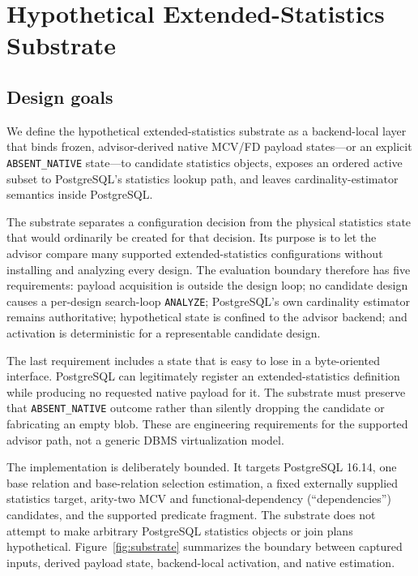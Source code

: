 \section{Hypothetical Extended-Statistics Substrate}
\label{sec:substrate}

\subsection{Design goals}

We define the hypothetical extended-statistics substrate as a backend-local
layer that binds frozen, advisor-derived native MCV/FD payload states---or an
explicit \texttt{ABSENT\_NATIVE} state---to candidate statistics objects,
exposes an ordered active subset to PostgreSQL's statistics lookup path, and
leaves cardinality-estimator semantics inside PostgreSQL.

The substrate separates a configuration decision from the physical
statistics state that would ordinarily be created for that decision.  Its
purpose is to let the advisor compare many supported extended-statistics
configurations without installing and analyzing every design.  The
evaluation boundary therefore has five requirements: payload acquisition is
outside the design loop; no candidate design causes a per-design search-loop
\texttt{ANALYZE}; PostgreSQL's own cardinality estimator remains authoritative;
hypothetical state is confined to the advisor backend; and activation is
deterministic for a representable candidate design.

The last requirement includes a state that is easy to lose in a byte-oriented
interface.  PostgreSQL can legitimately register an extended-statistics
definition while producing no requested native payload for it.  The substrate
must preserve that \texttt{ABSENT\_NATIVE} outcome rather than silently
dropping the candidate or fabricating an empty blob.  These are engineering
requirements for the supported advisor path, not a generic DBMS
virtualization model.

The implementation is deliberately bounded.  It targets PostgreSQL 16.14,
one base relation and base-relation selection estimation, a fixed externally
supplied statistics target, arity-two MCV and functional-dependency
(``dependencies'') candidates, and the supported predicate fragment.  The
substrate does not attempt to make arbitrary PostgreSQL statistics objects or
join plans hypothetical.  Figure~\ref{fig:substrate} summarizes the boundary
between captured inputs, derived payload state, backend-local activation, and
native estimation.

